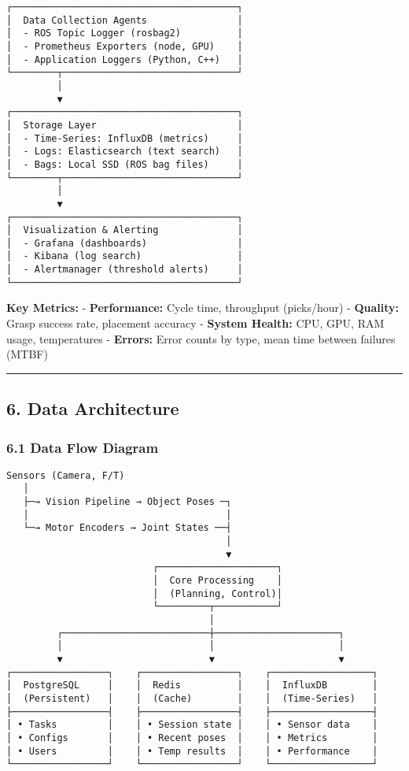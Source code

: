 \documentclass[
]{article}
\begin{document}
\begin{verbatim}
┌────────────────────────────────────────┐
│  Data Collection Agents                │
│  - ROS Topic Logger (rosbag2)          │
│  - Prometheus Exporters (node, GPU)    │
│  - Application Loggers (Python, C++)   │
└────────┬───────────────────────────────┘
         │
         ▼
┌────────────────────────────────────────┐
│  Storage Layer                         │
│  - Time-Series: InfluxDB (metrics)     │
│  - Logs: Elasticsearch (text search)   │
│  - Bags: Local SSD (ROS bag files)     │
└────────┬───────────────────────────────┘
         │
         ▼
┌────────────────────────────────────────┐
│  Visualization & Alerting              │
│  - Grafana (dashboards)                │
│  - Kibana (log search)                 │
│  - Alertmanager (threshold alerts)     │
└────────────────────────────────────────┘
\end{verbatim}

\textbf{Key Metrics:} - \textbf{Performance:} Cycle time, throughput
(picks/hour) - \textbf{Quality:} Grasp success rate, placement accuracy
- \textbf{System Health:} CPU, GPU, RAM usage, temperatures -
\textbf{Errors:} Error counts by type, mean time between failures (MTBF)

\begin{center}\rule{0.5\linewidth}{0.5pt}\end{center}

\hypertarget{data-architecture}{%
\subsection{6. Data Architecture}\label{data-architecture}}

\hypertarget{data-flow-diagram}{%
\subsubsection{6.1 Data Flow Diagram}\label{data-flow-diagram}}

\begin{verbatim}
Sensors (Camera, F/T)
   │
   ├─→ Vision Pipeline → Object Poses ─┐
   │                                   │
   └─→ Motor Encoders → Joint States ──┤
                                       │
                                       ▼
                          ┌─────────────────────┐
                          │  Core Processing    │
                          │  (Planning, Control)│
                          └─────────┬───────────┘
                                    │
         ┌──────────────────────────┼──────────────────────┐
         │                          │                      │
         ▼                          ▼                      ▼
┌─────────────────┐    ┌─────────────────┐    ┌──────────────────┐
│  PostgreSQL     │    │  Redis          │    │  InfluxDB        │
│  (Persistent)   │    │  (Cache)        │    │  (Time-Series)   │
├─────────────────┤    ├─────────────────┤    ├──────────────────┤
│ • Tasks         │    │ • Session state │    │ • Sensor data    │
│ • Configs       │    │ • Recent poses  │    │ • Metrics        │
│ • Users         │    │ • Temp results  │    │ • Performance    │
└─────────────────┘    └─────────────────┘    └──────────────────┘
\end{verbatim}
\end{document}
